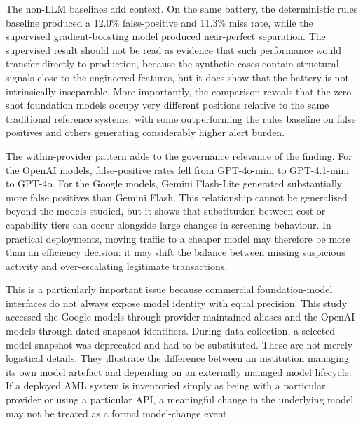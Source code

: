 \documentclass[pdflatex,sn-basic,Numbered]{sn-jnl}
\begin{document}
The non-LLM baselines add context. On the same battery, the deterministic rules baseline produced a 12.0\% false-positive and 11.3\% miss rate, while the supervised gradient-boosting model produced near-perfect separation. The supervised result should not be read as evidence that such performance would transfer directly to production, because the synthetic cases contain structural signals close to the engineered features, but it does show that the battery is not intrinsically inseparable. More importantly, the comparison reveals that the zero-shot foundation models occupy very different positions relative to the same traditional reference systems, with some outperforming the rules baseline on false positives and others generating considerably higher alert burden.

The within-provider pattern adds to the governance relevance of the finding. For the OpenAI models, false-positive rates fell from GPT-4o-mini to GPT-4.1-mini to GPT-4o. For the Google models, Gemini Flash-Lite generated substantially more false positives than Gemini Flash. This relationship cannot be generalised beyond the models studied, but it shows that substitution between cost or capability tiers can occur alongside large changes in screening behaviour. In practical deployments, moving traffic to a cheaper model may therefore be more than an efficiency decision: it may shift the balance between missing suspicious activity and over-escalating legitimate transactions.

This is a particularly important issue because commercial foundation-model interfaces do not always expose model identity with equal precision. This study accessed the Google models through provider-maintained aliases and the OpenAI models through dated snapshot identifiers. During data collection, a selected model snapshot was deprecated and had to be substituted. These are not merely logistical details. They illustrate the difference between an institution managing its own model artefact and depending on an externally managed model lifecycle. If a deployed AML system is inventoried simply as being with a particular provider or using a particular API, a meaningful change in the underlying model may not be treated as a formal model-change event.
\end{document}
